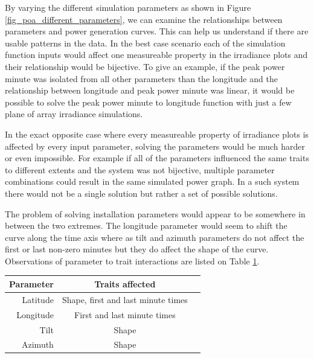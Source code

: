 \noindent By varying the different simulation parameters as shown in Figure \ref{fig_poa_different_parameters}, we can examine the relationships between parameters and power generation curves. This can help us understand if there are usable patterns in the data. In the best case scenario each of the simulation function inputs would affect one measureable property in the irradiance plots and their relationship would be bijective. To give an example, if the peak power minute was isolated from all other parameters than the longitude and the relationship between longitude and peak power minute was linear, it would be possible to solve the peak power minute to longitude function with just a few plane of array irradiance simulations.

In the exact opposite case where every measureable property of irradiance plots is affected by every input parameter, solving the parameters would be much harder or even impossible. For example if all of the parameters influenced the same traits to different extents and the system was not bijective, multiple parameter combinations could result in the same simulated power graph. In a such system there would not be a single solution but rather a set of possible solutions.

The problem of solving installation parameters would appear to be somewhere in between the two extremes. The longitude parameter would seem to shift the curve along the time axis where as tilt and azimuth parameters do not affect the first or last non-zero minutes but they do affect the shape of the curve. Observations of parameter to trait interactions are listed on Table \ref{table_traits}.



\begin{table}[H]
\centering
\begin{tabular}{r|cc} \hline\hline

 Parameter & Traits affected\\ \hline
 Latitude & Shape, first and last minute times\\
 Longitude & First and last minute times\\
 Tilt & Shape\\
 Azimuth & Shape\\

\hline\hline
\end{tabular}
\label{table_traits}
\end{table}



